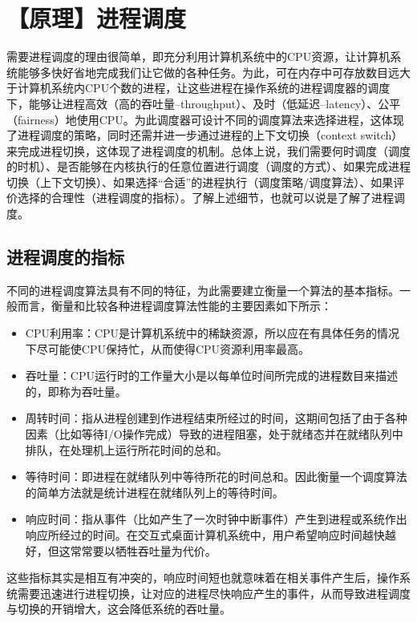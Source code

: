 \section{【原理】进程调度}\label{ux539fux7406ux8fdbux7a0bux8c03ux5ea6}

需要进程调度的理由很简单，即充分利用计算机系统中的CPU资源，让计算机系统能够多快好省地完成我们让它做的各种任务。为此，可在内存中可存放数目远大于计算机系统内CPU个数的进程，让这些进程在操作系统的进程调度器的调度下，能够让进程高效（高的吞吐量--throughput）、及时（低延迟--latency）、公平（fairness）地使用CPU。为此调度器可设计不同的调度算法来选择进程，这体现了进程调度的策略，同时还需并进一步通过进程的上下文切换（context
switch）来完成进程切换，这体现了进程调度的机制。总体上说，我们需要何时调度（调度的时机）、是否能够在内核执行的任意位置进行调度（调度的方式）、如果完成进程切换（上下文切换）、如果选择``合适''的进程执行（调度策略/调度算法）、如果评价选择的合理性（进程调度的指标）。了解上述细节，也就可以说是了解了进程调度。

\subsection{进程调度的指标}\label{ux8fdbux7a0bux8c03ux5ea6ux7684ux6307ux6807}

不同的进程调度算法具有不同的特征，为此需要建立衡量一个算法的基本指标。一般而言，衡量和比较各种进程调度算法性能的主要因素如下所示：

\begin{itemize}
\item
  CPU利用率：CPU是计算机系统中的稀缺资源，所以应在有具体任务的情况下尽可能使CPU保持忙，从而使得CPU资源利用率最高。
\item
  吞吐量：CPU运行时的工作量大小是以每单位时间所完成的进程数目来描述的，即称为吞吐量。
\item
  周转时间：指从进程创建到作进程结束所经过的时间，这期间包括了由于各种因素（比如等待I/O操作完成）导致的进程阻塞，处于就绪态并在就绪队列中排队，在处理机上运行所花时间的总和。
\item
  等待时间：即进程在就绪队列中等待所花的时间总和。因此衡量一个调度算法的简单方法就是统计进程在就绪队列上的等待时间。
\item
  响应时间：指从事件（比如产生了一次时钟中断事件）产生到进程或系统作出响应所经过的时间。在交互式桌面计算机系统中，用户希望响应时间越快越好，但这常常要以牺牲吞吐量为代价。
\end{itemize}

这些指标其实是相互有冲突的，响应时间短也就意味着在相关事件产生后，操作系统需要迅速进行进程切换，让对应的进程尽快响应产生的事件，从而导致进程调度与切换的开销增大，这会降低系统的吞吐量。

